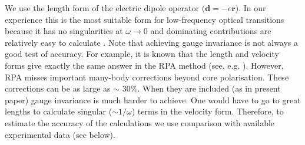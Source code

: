 \documentclass[10pt,a4paper, twoside, openright]{report}
\begin{document}
\iffalse

 We use the length form of the electric dipole operator ($\mathbf{d} = -e\mathbf{r}$). In our experience this is the most suitable form for low-frequency optical transitions because it has no singularities at $\omega \rightarrow 0$ and dominating contributions are relatively easy to calculate \cite{DFSS1987_2, DFSS1987}. Note that achieving gauge invariance is not always a good test of accuracy. For example, it is known that the length and velocity forms give exactly the same answer in the RPA method (see, e.g. \cite{DzuFlaSilSus87, DFSS1986}). However, RPA misses important many-body corrections beyond core polarisation. These corrections can be as large as $\sim$ 30\%. When they are included (as in present paper) gauge invariance is much harder to achieve. One would have to go to great lengths to calculate singular ($\sim 1/\omega$) terms in the velocity form. Therefore, to estimate the accuracy of the calculations we use comparison with available experimental data (see below).\\
\end{document}
